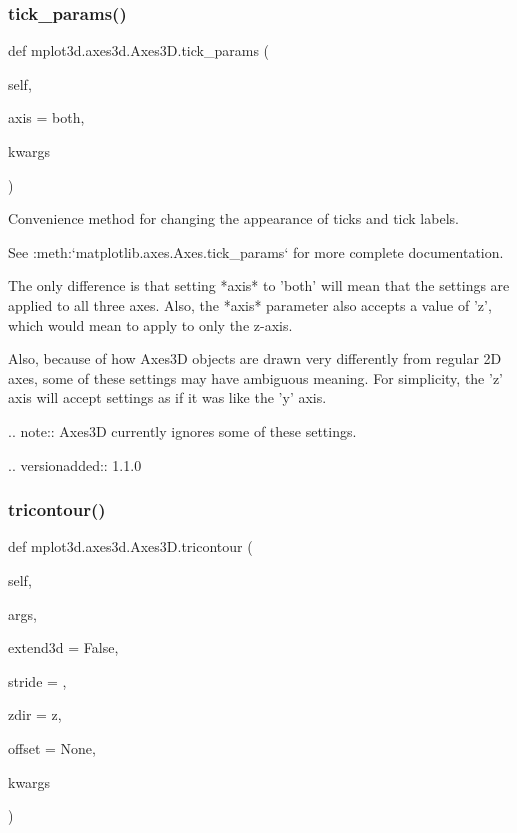 \begin{DoxyVerb}
\subsubsection{\texorpdfstring{tick\+\_\+params()}{tick\_params()}}
{\footnotesize\ttfamily def mplot3d.\+axes3d.\+Axes3\+D.\+tick\+\_\+params (\begin{DoxyParamCaption}\item[{}]{self,  }\item[{}]{axis = {\ttfamily \textquotesingle{}both\textquotesingle{}},  }\item[{}]{kwargs }\end{DoxyParamCaption})}

\begin{DoxyVerb}Convenience method for changing the appearance of ticks and
tick labels.

See :meth:`matplotlib.axes.Axes.tick_params` for more complete
documentation.

The only difference is that setting *axis* to 'both' will
mean that the settings are applied to all three axes. Also,
the *axis* parameter also accepts a value of 'z', which
would mean to apply to only the z-axis.

Also, because of how Axes3D objects are drawn very differently
from regular 2D axes, some of these settings may have
ambiguous meaning.  For simplicity, the 'z' axis will
accept settings as if it was like the 'y' axis.

.. note::
   Axes3D currently ignores some of these settings.

.. versionadded:: 1.1.0
\end{DoxyVerb}
 \mbox{\label{classmplot3d_1_1axes3d_1_1Axes3D_a15944a728b8fb94ec37ece15e87cd49b}} 
\subsubsection{\texorpdfstring{tricontour()}{tricontour()}}
{\footnotesize\ttfamily def mplot3d.\+axes3d.\+Axes3\+D.\+tricontour (\begin{DoxyParamCaption}\item[{}]{self,  }\item[{}]{args,  }\item[{}]{extend3d = {\ttfamily False},  }\item[{}]{stride = {},  }\item[{}]{zdir = {\ttfamily \textquotesingle{}z\textquotesingle{}},  }\item[{}]{offset = {\ttfamily None},  }\item[{}]{kwargs }\end{DoxyParamCaption})}


\end{DoxyVerb}

